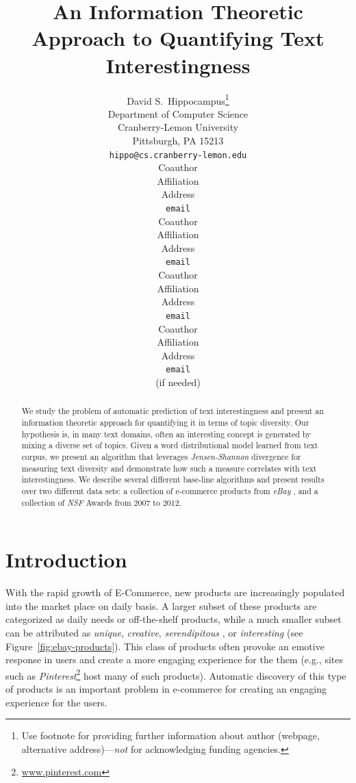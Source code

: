 \documentclass{article} %
\title{An Information Theoretic Approach to Quantifying Text Interestingness}
\author{
David S.~Hippocampus\thanks{ Use footnote for providing further information
about author (webpage, alternative address)---\emph{not} for acknowledging
funding agencies.} \\
Department of Computer Science\\
Cranberry-Lemon University\\
Pittsburgh, PA 15213 \\
\texttt{hippo@cs.cranberry-lemon.edu} \\
\And
Coauthor \\
Affiliation \\
Address \\
\texttt{email} \\
\AND
Coauthor \\
Affiliation \\
Address \\
\texttt{email} \\
\And
Coauthor \\
Affiliation \\
Address \\
\texttt{email} \\
\And
Coauthor \\
Affiliation \\
Address \\
\texttt{email} \\
(if needed)\\
}
\begin{document}
\maketitle

\begin{abstract}

We study the problem of automatic prediction of text interestingness and present an information theoretic approach for
quantifying it in terms of topic diversity. Our hypothesis is, in many text domains, often an interesting
concept is generated by mixing a diverse set of topics. Given a word distributional model learned from text corpus, we present
an algorithm that leverages {\sl Jensen-Shannon} divergence for measuring text diversity and demonstrate how such a measure
correlates with text interestingness. We describe several different base-line algorithms and present results over two different
data sets: a collection of e-commerce products from {\sl eBay} , and a collection of {\sl NSF} Awards from $2007$ to $2012$.
\end{abstract}



\section{Introduction}
\label{sec:introduction}

With the rapid growth of E-Commerce, new products are increasingly populated into the market place on daily basis.  A larger subset of these products are 
categorized as daily needs or off-the-shelf products, while a much smaller subset can be attributed as {\em unique}, {\em creative}, {\em serendipitous }, or {\em interesting} (see Figure~\ref{fig:ebay-products}). This class of products often provoke an emotive response in users and create a more engaging experience for the them (e.g., sites such as {\sl Pinterest}\footnote{\url{www.pinterest.com}} host many of such products). Automatic discovery of this type of products is an important problem in e-commerce for creating an engaging experience for the users.  
\end{document}
